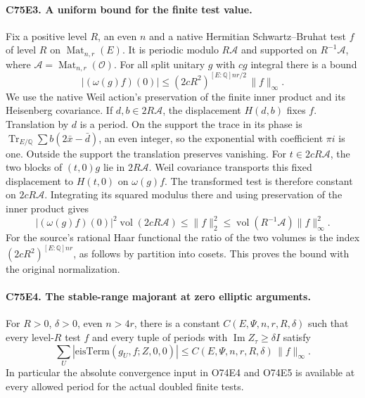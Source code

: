 \paragraph{C75E3. A uniform bound for the finite test value.}
Fix a positive level $R$, an even $n$ and a native Hermitian
Schwartz--Bruhat test $f$ of level $R$ on $\operatorname{Mat}_{n,r}(E)$.
It is periodic modulo $R\mathcal A$ and supported on
$R^{-1}\mathcal A$, where $\mathcal A=\operatorname{Mat}_{n,r}(\mathcal O)$.
For all split unitary $g$ with $cg$ integral there is a bound
\[
         |(\omega(g) f)(0)|\le
         (2cR^2)^{[E:\mathbb Q]nr/2}\,\|f\|_\infty .
\]
We use the native Weil action's preservation of the finite inner
product and its Heisenberg covariance. If $d,b\in2R\mathcal A$,
the displacement $H(d,b)$ fixes $f$. Translation by $d$ is a
period. On the support the trace in its phase is
$\operatorname{Tr}_{E/\mathbb Q}\sum b(2\bar x-\bar d)$, an even
integer, so the exponential with coefficient $\pi i$ is one.
Outside the support the translation preserves vanishing.
For $t\in2cR\mathcal A$, the two blocks of $(t,0)g$ lie in
$2R\mathcal A$. Weil covariance transports this fixed displacement
to $H(t,0)$ on $\omega(g)f$. The transformed test is therefore
constant on $2cR\mathcal A$. Integrating its squared modulus there
and using preservation of the inner product gives
\[
 |(\omega(g)f)(0)|^2\operatorname{vol}(2cR\mathcal A)
 \le\|f\|_2^2\le\operatorname{vol}(R^{-1}\mathcal A)\|f\|_\infty^2.
\]
For the source's rational Haar functional the ratio of the two
volumes is the index $(2cR^2)^{[E:\mathbb Q]nr}$, as follows by
partition into cosets. This proves the bound with the original
normalization.

\paragraph{C75E4. The stable-range majorant at zero elliptic arguments.}
For $R>0$, $\delta>0$, even $n>4r$, there is a constant
$C(E,\Psi,n,r,R,\delta)$ such that every level-$R$ test $f$ and every
tuple of periods with $\operatorname{Im}Z_\tau\ge\delta I$ satisfy
\[
 \sum_U |\mathrm{eisTerm}(g_U,f;Z,0,0)|
             \le C(E,\Psi,n,r,R,\delta)\,\|f\|_\infty .
\]
In particular the absolute convergence input in O74E4 and O74E5 is
available at every allowed period for the actual doubled finite tests.

